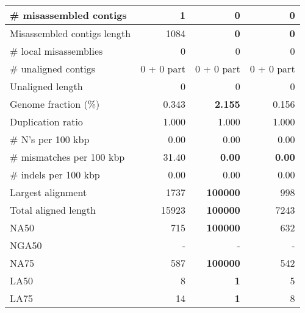 \documentclass[12pt,a4paper]{article}
\begin{document}
\begin{table}[ht]
\begin{center}
\begin{tabular}{|l*{3}{|r}|}
\# misassembled contigs & 1 & {\bf 0} & {\bf 0} \\ \hline
Misassembled contigs length & 1084 & {\bf 0} & {\bf 0} \\ \hline
\# local misassemblies & 0 & 0 & 0 \\ \hline
\# unaligned contigs & 0 + 0 part & 0 + 0 part & 0 + 0 part \\ \hline
Unaligned length & 0 & 0 & 0 \\ \hline
Genome fraction (\%) & 0.343 & {\bf 2.155} & 0.156 \\ \hline
Duplication ratio & 1.000 & 1.000 & 1.000 \\ \hline
\# N's per 100 kbp & 0.00 & 0.00 & 0.00 \\ \hline
\# mismatches per 100 kbp & 31.40 & {\bf 0.00} & {\bf 0.00} \\ \hline
\# indels per 100 kbp & 0.00 & 0.00 & 0.00 \\ \hline
Largest alignment & 1737 & {\bf 100000} & 998 \\ \hline
Total aligned length & 15923 & {\bf 100000} & 7243 \\ \hline
NA50 & 715 & {\bf 100000} & 632 \\ \hline
NGA50 & - & - & - \\ \hline
NA75 & 587 & {\bf 100000} & 542 \\ \hline
LA50 & 8 & {\bf 1} & 5 \\ \hline
LA75 & 14 & {\bf 1} & 8 \\ \hline
\end{tabular}
\end{center}
\end{table}
\end{document}
